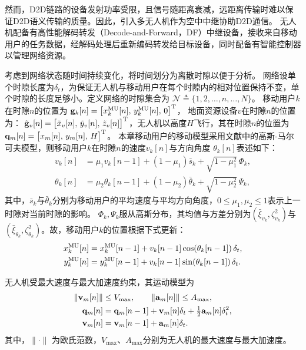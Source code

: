 然而，D2D链路的设备发射功率受限，且信号随距离衰减，远距离传输时难以保证D2D语义传输的质量。因此，引入多无人机作为空中中继协助D2D通信。
无人机配备有高性能解码转发（Decode-and-Forward，DF）中继设备，接收来自移动用户的任务数据，经解码处理后重新编码转发给目标设备，同时配备有智能控制器以管理网络资源。

考虑到网络状态随时间持续变化，将时间划分为离散时隙以便于分析。
网络设单个时隙长度为$\delta_t$，为保证无人机与移动用户在每个时隙内的相对位置保持不变，单个时隙的长度足够小。定义网络的时隙集合为
$\mathcal{N}\triangleq\{1,2,\ldots,n,\ldots,N\}$。
移动用户$k$在时隙$n$的位置为
${\bf g}_k[n]=\big[x_k^{\rm MU}[n],\,y_k^{\rm MU}[n],\,0\big]^{\text{T}}$，
地面资源设备$v$在时隙$n$的位置为：
$\tilde{\bf g}_v[n]=\big[\tilde{x}_v[n],\,\tilde{y}_v[n],\,\tilde{z}_v[n]\big]^{\text{T}}$，无人机以高度$H$飞行，其在时隙$n$的位置为
${\bf q}_m[n]=\big[x_{m}[n],\,y_{m}[n],\,H\big]^{\text{T}}$。
本章移动用户的移动模型采用文献\cite{Liu_2020_TVT_Path}中的高斯-马尔可夫模型，则移动用户$k$在时隙$n$的速度$v_k[n]$与方向角度 $\theta_k[n]$表述如下：
\begin{align}
v_k[n] &= \mu_1 v_k[n-1] + (1- \mu_1)\bar s_k + \sqrt{1 - \mu_1^2}\,\Phi_k, \\
\theta_k[n] &= \mu_2 \theta_k[n-1] + (1- \mu_2)\bar \theta_k + \sqrt{1- \mu_2^2}\,\Psi_k,
\end{align}
其中，$\bar s_k$与$\bar \theta_k$分别为移动用户的平均速度与平均方向角度，$0\le \mu_1,\mu_2\le 1$表示上一时隙对当前时隙的影响。
$\Phi_k,\Psi_k$服从高斯分布，其均值与方差分别为$(\bar \xi_{v_k}, \zeta_{v_k}^2)$与$(\bar \xi_{\theta_k}, \zeta_{\theta_k}^2)$。故，移动用户$k$的位置根据下式更新：
\begin{align}
x_k^{\rm MU}[n] &= x_k^{\rm MU}[n-1] + v_k[n-1]\cos(\theta_k[n-1])\,\delta_t, \\
y_k^{\rm MU}[n] &= y_k^{\rm MU}[n-1] + v_k[n-1]\sin(\theta_k[n-1])\,\delta_t.
\end{align}

无人机受最大速度与最大加速度约束，其运动模型为
\begin{align}
\|\mathbf{v}_m[n]\| &\leq V_{\max}, \qquad \|\mathbf{a}_m[n]\| \leq A_{\max},\label{eq:va}\\
{\bf q}_m[n] &= {\bf q}_m[n-1] + {\bf v}_m[n] \delta_t + \tfrac{1}{2} {\bf a}_m[n] \delta_t^2,\label{eq:q}\\
{\bf v}_m[n] &= {\bf v}_m[n-1] + {\bf a}_m[n] \delta_t.\label{eq:v}
\end{align}
其中，$\|\cdot\|$ 为欧氏范数，$V_{\max}$、$A_{\max}$分别为无人机的最大速度与最大加速度。


